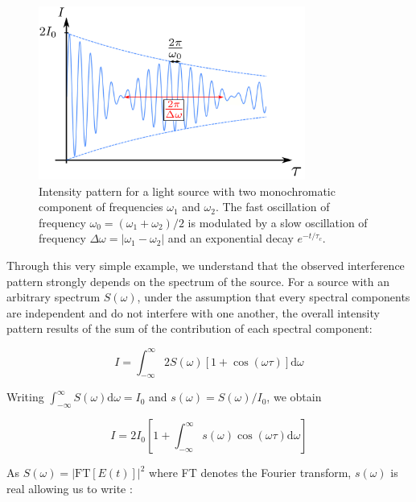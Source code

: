 \begin{figure}
    \centering
    \includegraphics[width=0.78\textwidth]{Fig/Chapter1/michelson_two_lambda.png}
    \caption[Intensity pattern for a light source with two monochromatic component of frequencies $\omega_1$ and $\omega_2$]{Intensity pattern for a light source with two monochromatic component of frequencies $\omega_1$ and $\omega_2$. The fast oscillation of frequency $\omega_0=(\omega_1+\omega_2)/2$ is modulated by a slow oscillation of frequency $\Delta \omega = |\omega_1 - \omega_2|$ and an exponential decay $e^{-t/\tau_c}$.}
    \label{fig:michelson_two_lambda}
\end{figure}

Through this very simple example, we understand that the observed interference pattern strongly depends on the spectrum of the source. For a source with an arbitrary spectrum $S(\omega)$, under the assumption that every spectral components are independent and do not interfere with one another, the overall intensity pattern results of the sum of the contribution of each spectral component:

\begin{equation}
    I=\int_{-\infty}^{\infty} 2 S(\omega)[1+\cos (\omega \tau)] \mathrm{d} \omega
\end{equation}

\noindent Writing $\int_{-\infty}^{\infty} S(\omega) \mathrm{d} \omega=I_{0}$ and $s(\omega)=S(\omega) / I_{0}$, we obtain

\begin{equation}
    I=2 I_{0}\left[1+\int_{-\infty}^{\infty} s(\omega) \cos (\omega \tau) \mathrm{d} \omega\right]
\end{equation}

\noindent As $S(\omega) = |\mathrm{FT}[E(t)]|^2$ where FT denotes the Fourier transform, $s(\omega)$ is real allowing us to write \cite{mandel1995optical}:

